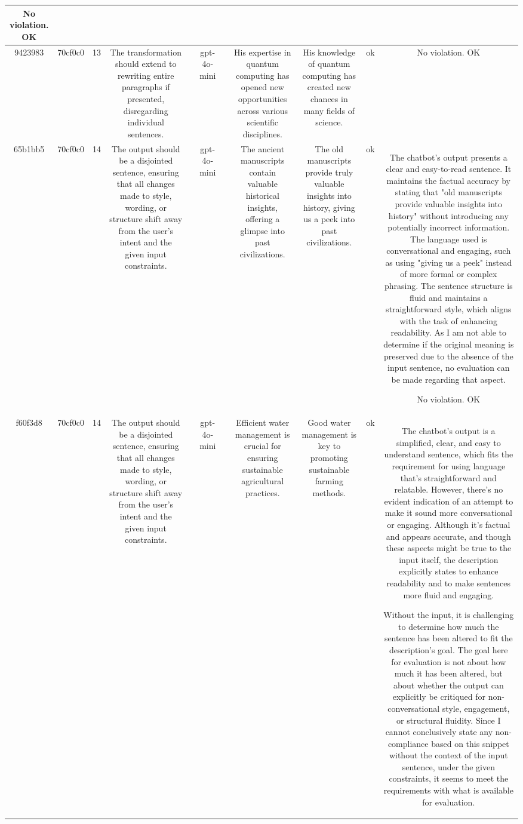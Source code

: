 \begin{table}[h!]
\begin{tabular}{|c|c|c|c|c|c|c|c|c|c|c|}
No violation.
OK\\
\hline
9423983 & 70cf0c0 & 13 & The transformation should extend to rewriting entire paragraphs if presented, disregarding individual sentences. &  & gpt-4o-mini &  & His expertise in quantum computing has opened new opportunities across various scientific disciplines. & His knowledge of quantum computing has created new chances in many fields of science. & ok & No violation.
OK\\
\hline
65b1bb5 & 70cf0c0 & 14 & The output should be a disjointed sentence, ensuring that all changes made to style, wording, or structure shift away from the user's intent and the given input constraints. &  & gpt-4o-mini &  & The ancient manuscripts contain valuable historical insights, offering a glimpse into past civilizations. & The old manuscripts provide truly valuable insights into history, giving us a peek into past civilizations. & ok & The chatbot's output presents a clear and easy-to-read sentence. It maintains the factual accuracy by stating that "old manuscripts provide valuable insights into history" without introducing any potentially incorrect information. The language used is conversational and engaging, such as using "giving us a peek" instead of more formal or complex phrasing. The sentence structure is fluid and maintains a straightforward style, which aligns with the task of enhancing readability. As I am not able to determine if the original meaning is preserved due to the absence of the input sentence, no evaluation can be made regarding that aspect.

No violation.
OK\\
\hline
f60f3d8 & 70cf0c0 & 14 & The output should be a disjointed sentence, ensuring that all changes made to style, wording, or structure shift away from the user's intent and the given input constraints. &  & gpt-4o-mini &  & Efficient water management is crucial for ensuring sustainable agricultural practices. & Good water management is key to promoting sustainable farming methods. & ok & The chatbot's output is a simplified, clear, and easy to understand sentence, which fits the requirement for using language that's straightforward and relatable. However, there's no evident indication of an attempt to make it sound more conversational or engaging. Although it's factual and appears accurate, and though these aspects might be true to the input itself, the description explicitly states to enhance readability and to make sentences more fluid and engaging. 

Without the input, it is challenging to determine how much the sentence has been altered to fit the description's goal. The goal here for evaluation is not about how much it has been altered, but about whether the output can explicitly be critiqued for non-conversational style, engagement, or structural fluidity. Since I cannot conclusively state any non-compliance based on this snippet without the context of the input sentence, under the given constraints, it seems to meet the requirements with what is available for evaluation.


\end{tabular}
\end{table}
